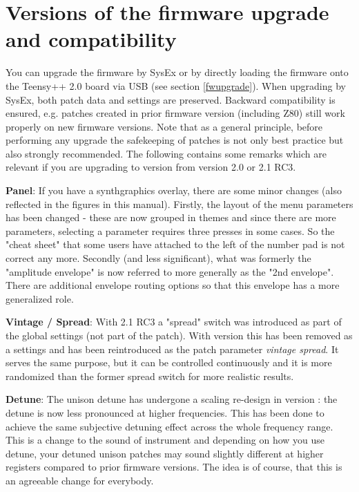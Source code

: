 \documentclass[landscape, 11pt, oneside]{report}
\newenvironment{flowtext}{\addmargin[0cm]{7cm}}{\endaddmargin} %
\begin{document}
\begin{flowtext}
\section{Versions of the firmware upgrade and compatibility}

You can upgrade the firmware by SysEx or by directly loading the firmware onto the Teensy++ 2.0 board via USB (see section \ref{fwupgrade}). When upgrading by SysEx, both patch data and settings are preserved. Backward compatibility is ensured, e.g. patches created in prior firmware version (including Z80) still work properly on new firmware versions. Note that as a general principle, before performing any upgrade the safekeeping of patches is not only best practice but also strongly recommended. The following contains some remarks which are relevant if you are upgrading to version \version from version 2.0 or 2.1 RC3.

\textbf{Panel}: If you have a synthgraphics overlay, there are some minor changes (also reflected in the figures in this manual). Firstly, the layout of the menu parameters has been changed - these are now grouped in themes and since there are more parameters, selecting a parameter requires three presses in some cases. So the "cheat sheet" that some users have attached to the left of the number pad is not correct any more. Secondly (and less significant), what was formerly the "amplitude envelope" is now referred to more generally as the "2nd envelope". There are additional envelope routing options so that this envelope has a more generalized role. 

\textbf{Vintage / Spread}: With 2.1 RC3 a "spread" switch was introduced as part of the global settings (not part of the patch). With version \version this has been removed as a settings and has been reintroduced as the patch parameter \textit{vintage spread}. It serves the same purpose, but it can be controlled continuously and it is more randomized than the former spread switch for more realistic results.

\textbf{Detune}: The unison detune has undergone a scaling re-design in version \version: the detune is now less pronounced at higher frequencies. This has been done to achieve the same subjective detuning effect across the whole frequency range. This is a change to the sound of instrument and depending on how you use detune, your detuned unison patches may sound slightly different at higher registers compared to prior firmware versions. The idea is of course, that this is an agreeable change for everybody.


\end{flowtext}
\end{document}
